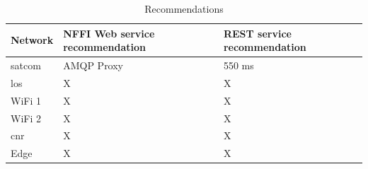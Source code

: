 \begin{table}[h]
\begin{tabular}{| l | l | l |}
\hline
  \textbf{Network} & \textbf{NFFI Web service recommendation} & \textbf{REST service recommendation}\\ \hline
  \gls{satcom} & AMQP Proxy & 550 ms \\ \hline
  \gls{los} & X & X\\ \hline
  WiFi 1 & X & X \\ \hline
  WiFi 2 & X & X \\ \hline
  \gls{cnr} & X & X \\ \hline
  Edge & X & X\\ \hline
\end{tabular}
\caption{Recommendations}
\label{table-evaluation-summary}
\end{table}

